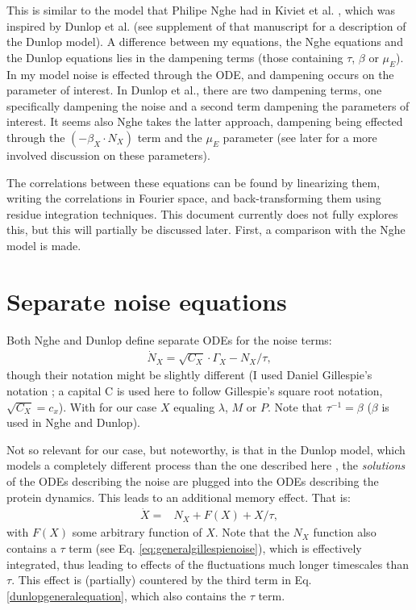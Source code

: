 \documentclass[a4paper,twoside,10pt]{report}
\begin{document}
This is similar to the model that Philipe Nghe had in Kiviet et al. \cite{Kiviet2014}, which was inspired by Dunlop et al. \cite{Dunlop2008} (see supplement of that manuscript for a description of the Dunlop model).
%
A difference between my equations, the Nghe equations and the Dunlop equations lies in the dampening terms (those containing $\tau$, $\beta$ or $\mu_E$). In my model noise is effected through the ODE, and dampening occurs on the parameter of interest. In Dunlop et al., there are two dampening terms, one specifically dampening the noise and a second term dampening the parameters of interest. It seems also Nghe takes the latter approach, dampening being effected through the $(-\beta_X \cdot N_X)$ term and the $\mu_E$ parameter (see later for a more involved discussion on these parameters).

The correlations between these equations can be found by linearizing them, writing the correlations in Fourier space, and back-transforming them using residue integration techniques. 
This document currently does not fully explores this, but this will partially be discussed later.
First, a comparison with the Nghe model is made.

\section{Separate noise equations}

Both Nghe and Dunlop define separate ODEs for the noise terms:
%
\begin{align}
\label{eq:generalgillespienoise}
\dot{N}_X = \sqrt{C_X} \cdot \Gamma_X - N_X/\tau
,
\end{align}
%
though their notation might be slightly different (I used Daniel Gillespie's notation \cite{Gillespie1996}; a capital C is used here to follow Gillespie's square root notation, $\sqrt{C_X}=c_x$).
With for our case $X$ equaling $\lambda$, $M$ or $P$. Note that $\tau^{-1}=\beta$ ($\beta$ is used in Nghe and Dunlop).

Not so relevant for our case, but noteworthy, is that in the Dunlop model, which models a completely different process than the one described here \cite{Dunlop2008}, the \textit{solutions} of the ODEs describing the noise are plugged into the ODEs describing the protein dynamics. This leads to an additional memory effect.
%
That is:
%
\begin{align}
\label{dunlopgeneralequation}
\dot{X} = & N_X  + F(X) + X/\tau
,
\end{align}
%
with $F(X)$ some arbitrary function of $X$. 
Note that the $N_X$ function also contains a $\tau$ term (see Eq. \ref{eq:generalgillespienoise}), which is effectively integrated, thus leading to effects of the fluctuations much longer timescales than $\tau$. 
This effect is (partially) countered by the third term in Eq. \ref{dunlopgeneralequation}, which also contains the $\tau$ term.
\end{document}
